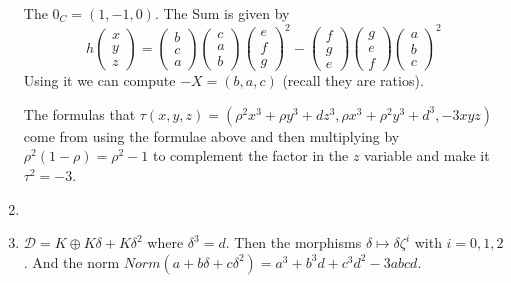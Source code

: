 \documentclass{article}
\begin{document}
\begin{multicols}{2}
\begin{enumerate}
The $0_C = (1,-1,0)$.
The Sum is given by
\[h \left(\begin{array}{c} x \\ y \\ z\end{array}\right) = 
\left(\begin{array}{c} b \\ c \\ a\end{array}\right)
\left(\begin{array}{c} c\\ a \\ b\end{array}\right)
\left(\begin{array}{c} e \\ f \\ g \end{array}\right)^2 -
\left(\begin{array}{c} f \\ g \\ e \end{array}\right)
\left(\begin{array}{c}g \\ e \\ f \end{array}\right)
\left(\begin{array}{c}a \\ b \\ c  \end{array}\right)^2\]
Using it we can compute $-X = (b,a,c)$ (recall they are ratios).

The formulas that $\tau(x,y,z) = (\rho^2x^3 + \rho y^3 + dz^3, \rho x^3 + \rho^2y^3 + d^3, - 3xyz)$ come from using the formulae above and then multiplying by $\rho^2(1-\rho) = \rho^2 - 1$ to complement the factor in the $z$ variable and make it $\tau^2 = -3$. 

\item 

\item $\mathcal{D} = K \oplus K\delta + K\delta^2$ where $\delta^3 = d$. Then the morphisms $\delta \mapsto \delta \zeta^i$ with $i = 0,1,2$. And the norm $Norm(a+b\delta + c\delta^2) = a^3 + b^3 d + c^3 d^2 - 3abcd$. 


\end{enumerate}
\end{multicols}
\end{document}
